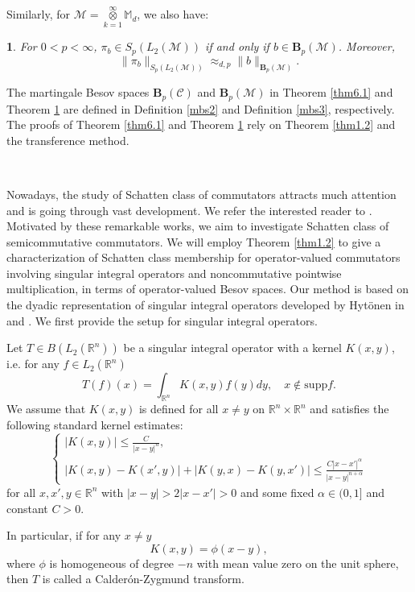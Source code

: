 \documentclass[oneside,english,a4wide]{amsart}
\numberwithin{equation}{section}
\numberwithin{figure}{section}
\theoremstyle{plain}
\newtheorem{thm}{\protect\theoremname}[section]
\theoremstyle{plain}
\theoremstyle{definition}
\theoremstyle{plain}
\theoremstyle{remark}
\theoremstyle{definition}
\theoremstyle{remark}
\theoremstyle{definition}
\providecommand{\theoremname}{Theorem}
\newcommand{\8}{\infty}
\begin{document}
Similarly, for $\mathscr{M}=\mathop{\otimes}\limits_{k=1}^{\infty}\mathbb{M}_{d}$, we also have:
\begin{thm}\label{thm7.1}
	For $0<p<\infty$, $\pi_b\in S_p(L_2(\mathscr{M}))$ if and only if $b\in \pmb{B}_p(\mathscr{M})$. Moreover,
	$$ \|\pi_b\|_{S_p(L_2(\mathscr{M})) }\approx_{d,p} \|b\|_{\pmb{B}_p(\mathscr{M})}. $$
\end{thm}

The martingale Besov spaces $\pmb{B}_p(\mathcal{C})$ and $\pmb{B}_p(\mathscr{M})$ in Theorem \ref{thm6.1} and Theorem \ref{thm7.1} are defined in Definition \ref{mbs2} and Definition \ref{mbs3}, respectively. The proofs of Theorem \ref{thm6.1} and Theorem \ref{thm7.1} rely on Theorem \ref{thm1.2} and the transference method.

\

 Nowadays, the study of Schatten class of commutators attracts much attention and is going through vast development. We refer the interested reader to \cite{FLL2023,FLLX2024,FLMSZ2024,GLW2023,LLW2023,LLW2024,LLWW2024}. Motivated by these remarkable works, we aim to investigate Schatten class of semicommutative commutators. We will employ Theorem \ref{thm1.2} to give a characterization of Schatten class membership for operator-valued commutators involving singular integral operators and noncommutative pointwise multiplication, in terms of operator-valued Besov spaces. Our method is based on the dyadic representation of singular integral operators developed by Hyt\"{o}nen in \cite{TH1} and \cite{TH2}. We first provide the setup for singular integral operators. 

Let $T\in B(L_2(\mathbb{R}^n))$ be a singular integral operator with a kernel $K(x, y)$,  i.e. for any $f\in L_2(\mathbb{R}^n)$
\[T(f)(x)=\int_{\mathbb{R}^n}K(x, y)f(y)dy, \quad x\notin \mathrm{supp}f.\]
We assume that $K(x, y)$ is defined for all $x\neq y$ on $\mathbb{R}^n\times \mathbb{R}^n$ and satisfies the following standard kernel estimates:
\begin{equation}\label{standard}
	\begin{cases}
		\displaystyle|K(x,y)|\le \frac{C}{|x-y|^n},\\
		\displaystyle|K(x,y)-K(x',y)|+|K(y,x)-K(y,x')|\le \frac{C |x-x'|^\alpha}{|x-y|^{n+\alpha}}
			\end{cases}
\end{equation}
for all $x,x',y\in\mathbb{R}^n$ with $|x-y|>2|x-x'|>0$ and some fixed $\alpha\in (0, 1]$ and constant $C>0$. 

In particular, if for any $x\neq y$ 
\begin{equation}\label{phi2333}
	K(x, y)= \phi(x-y),
\end{equation}
where $\phi$ is homogeneous of degree $-n$ with mean value zero on the unit sphere, then $T$ is called a Calder\'{o}n-Zygmund transform. 
\end{document}
